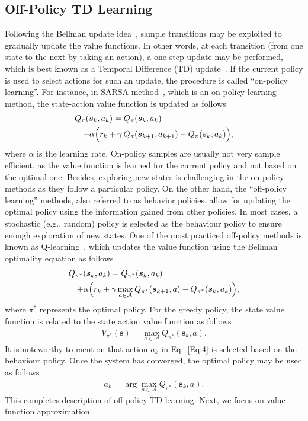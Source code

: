 \documentclass{ieeeaccess}
\def\mA{\mathcal{A}}
\def\k{_{k}}
\def\nk{_{k+1}}
\def\s{\bm{s}}
\begin{document}
\subsection{Off-Policy TD Learning}
Following the Bellman update idea~\cite{31}, sample transitions may be exploited to gradually update the value functions. In other words, at each transition (from one state to the next by taking an action), a one-step update may be performed, which is best known as a Temporal Difference (TD) update~\cite{31}. If the current policy is used to select actions for such an update, the procedure is called ``on-policy learning''. For instance, in SARSA method~\cite{32,Xia}, which is an on-policy learning method, the state-action value function is updated as follows
%
\begin{eqnarray}
\lefteqn{Q_{\pi}(\s\k, a\k) = Q_{\pi}(\s\k, a\k) \nonumber}\\
&&+\alpha \Big(r\k +\gamma\,Q_{\pi}(\s\nk, a\nk)  - Q_{\pi}(\s\k, a\k) \Big),
\end{eqnarray}
%
where $\alpha$ is the learning rate. On-policy samples are usually not very sample efficient, as the value function is learned for the current policy and not based on the optimal one. Besides, exploring new states is challenging in the on-policy methods as they follow a particular policy. On the other hand, the ``off-policy learning'' methods, also referred to as behavior policies, allow for updating the optimal policy using the information gained from other policies. In most cases, a stochastic (e.g., random) policy is selected as the behaviour policy to ensure enough exploration of new states. One of the most practiced off-policy methods is known as Q-learning~\cite{33,Ge,Xia,Li}, which updates the value function using the Bellman optimality equation as follows
%
\begin{eqnarray}
\lefteqn{Q_{\pi^*}(\s\k, a\k) = Q_{\pi^*}(\s\k, a\k) }\label{Eq:4}\\
&&+\alpha \Big(r\k +\gamma \max_{a\in\mA}Q_{\pi^*}(\s\nk, a)  - Q_{\pi^*}(\s\k, a\k) \Big),\nonumber
\end{eqnarray}
%
where $\pi^*$ represents the optimal policy. For the greedy policy, the state value function is related to the state action
value function as follows
%
\begin{eqnarray}
V_{\pi^*}(\s) = \max_{a\in\mA}Q_{\pi^*}(\s\k, a).
\end{eqnarray}
%
It is noteworthy to mention that action $a\k$ in Eq.~\eqref{Eq:4} is selected based on the behaviour policy. Once the system has converged, the optimal policy may be used as follows
%
\begin{eqnarray}
a\k = \arg\max_{a\in\mA}Q_{\pi^*}(\s\k, a).\label{Eq:6}
\end{eqnarray}
%
This completes description of off-policy TD learning. Next, we focus on value function approximation.
\end{document}
